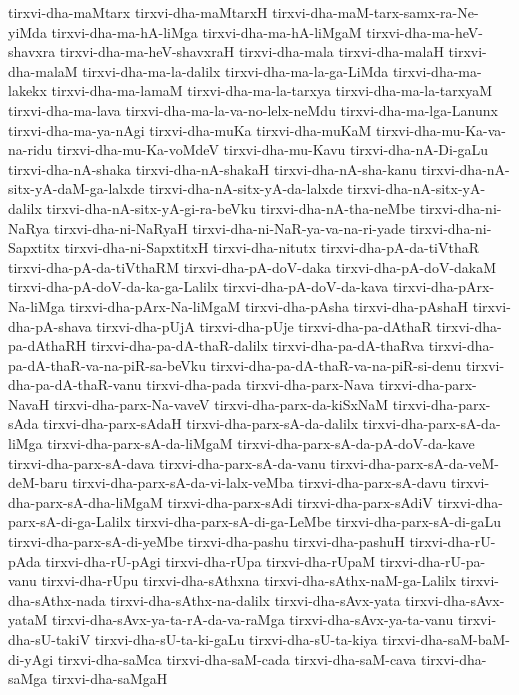 {tirxvi-dha-maMtarx
tirxvi-dha-maMtarxH
tirxvi-dha-maM-tarx-samx-ra-Ne-yiMda
tirxvi-dha-ma-hA-liMga
tirxvi-dha-ma-hA-liMgaM
tirxvi-dha-ma-heV-shavxra
tirxvi-dha-ma-heV-shavxraH
tirxvi-dha-mala
tirxvi-dha-malaH
tirxvi-dha-malaM
tirxvi-dha-ma-la-dalilx
tirxvi-dha-ma-la-ga-LiMda
tirxvi-dha-ma-lakekx
tirxvi-dha-ma-lamaM
tirxvi-dha-ma-la-tarxya
tirxvi-dha-ma-la-tarxyaM
tirxvi-dha-ma-lava
tirxvi-dha-ma-la-va-no-lelx-neMdu
tirxvi-dha-ma-lga-Lanunx
tirxvi-dha-ma-ya-nAgi
tirxvi-dha-muKa
tirxvi-dha-muKaM
tirxvi-dha-mu-Ka-va-na-ridu
tirxvi-dha-mu-Ka-voMdeV
tirxvi-dha-mu-Kavu
tirxvi-dha-nA-Di-gaLu
tirxvi-dha-nA-shaka
tirxvi-dha-nA-shakaH
tirxvi-dha-nA-sha-kanu
tirxvi-dha-nA-sitx-yA-daM-ga-lalxde
tirxvi-dha-nA-sitx-yA-da-lalxde
tirxvi-dha-nA-sitx-yA-dalilx
tirxvi-dha-nA-sitx-yA-gi-ra-beVku
tirxvi-dha-nA-tha-neMbe
tirxvi-dha-ni-NaRya
tirxvi-dha-ni-NaRyaH
tirxvi-dha-ni-NaR-ya-va-na-ri-yade
tirxvi-dha-ni-Sapxtitx
tirxvi-dha-ni-SapxtitxH
tirxvi-dha-nitutx
tirxvi-dha-pA-da-tiVthaR
tirxvi-dha-pA-da-tiVthaRM
tirxvi-dha-pA-doV-daka
tirxvi-dha-pA-doV-dakaM
tirxvi-dha-pA-doV-da-ka-ga-Lalilx
tirxvi-dha-pA-doV-da-kava
tirxvi-dha-pArx-Na-liMga
tirxvi-dha-pArx-Na-liMgaM
tirxvi-dha-pAsha
tirxvi-dha-pAshaH
tirxvi-dha-pA-shava
tirxvi-dha-pUjA
tirxvi-dha-pUje
tirxvi-dha-pa-dAthaR
tirxvi-dha-pa-dAthaRH
tirxvi-dha-pa-dA-thaR-dalilx
tirxvi-dha-pa-dA-thaRva
tirxvi-dha-pa-dA-thaR-va-na-piR-sa-beVku
tirxvi-dha-pa-dA-thaR-va-na-piR-si-denu
tirxvi-dha-pa-dA-thaR-vanu
tirxvi-dha-pada
tirxvi-dha-parx-Nava
tirxvi-dha-parx-NavaH
tirxvi-dha-parx-Na-vaveV
tirxvi-dha-parx-da-kiSxNaM
tirxvi-dha-parx-sAda
tirxvi-dha-parx-sAdaH
tirxvi-dha-parx-sA-da-dalilx
tirxvi-dha-parx-sA-da-liMga
tirxvi-dha-parx-sA-da-liMgaM
tirxvi-dha-parx-sA-da-pA-doV-da-kave
tirxvi-dha-parx-sA-dava
tirxvi-dha-parx-sA-da-vanu
tirxvi-dha-parx-sA-da-veM-deM-baru
tirxvi-dha-parx-sA-da-vi-lalx-veMba
tirxvi-dha-parx-sA-davu
tirxvi-dha-parx-sA-dha-liMgaM
tirxvi-dha-parx-sAdi
tirxvi-dha-parx-sAdiV
tirxvi-dha-parx-sA-di-ga-Lalilx
tirxvi-dha-parx-sA-di-ga-LeMbe
tirxvi-dha-parx-sA-di-gaLu
tirxvi-dha-parx-sA-di-yeMbe
tirxvi-dha-pashu
tirxvi-dha-pashuH
tirxvi-dha-rU-pAda
tirxvi-dha-rU-pAgi
tirxvi-dha-rUpa
tirxvi-dha-rUpaM
tirxvi-dha-rU-pa-vanu
tirxvi-dha-rUpu
tirxvi-dha-sAthxna
tirxvi-dha-sAthx-naM-ga-Lalilx
tirxvi-dha-sAthx-nada
tirxvi-dha-sAthx-na-dalilx
tirxvi-dha-sAvx-yata
tirxvi-dha-sAvx-yataM
tirxvi-dha-sAvx-ya-ta-rA-da-va-raMga
tirxvi-dha-sAvx-ya-ta-vanu
tirxvi-dha-sU-takiV
tirxvi-dha-sU-ta-ki-gaLu
tirxvi-dha-sU-ta-kiya
tirxvi-dha-saM-baM-di-yAgi
tirxvi-dha-saMca
tirxvi-dha-saM-cada
tirxvi-dha-saM-cava
tirxvi-dha-saMga
tirxvi-dha-saMgaH
}
